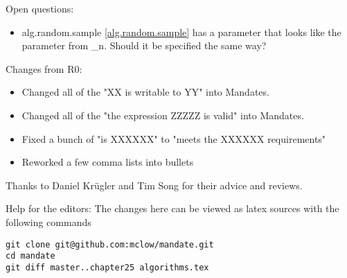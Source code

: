 Open questions:
\begin{itemize}
\item{alg.random.sample \ref{alg.random.sample} has a  parameter that looks like the  parameter from \*_n. Should it be specified the same way?}
\end{itemize}


Changes from R0:
\begin{itemize}
\item{Changed all of the "XX is writable to YY" into Mandates.}
\item{Changed all of the "the expression ZZZZZ is valid" into Mandates.}
\item{Fixed a bunch of "is XXXXXX" to "meets the XXXXXX requirements"}
\item{Reworked a few comma lists into bullets}
\end{itemize}

Thanks to Daniel Krügler and Tim Song for their advice and reviews.
 
\vfill
Help for the editors: The changes here can be viewed as latex sources with the following commands
\begin{verbatim}
git clone git@github.com:mclow/mandate.git
cd mandate
git diff master..chapter25 algorithms.tex
\end{verbatim}

